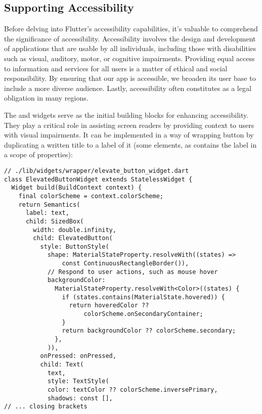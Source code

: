 
\subsection{Supporting Accessibility}

Before delving into Flutter's accessibility capabilities, it's valuable to comprehend the significance of accessibility. 
Accessibility involves the design and development of applications that are usable by all individuals, including those 
with disabilities such as visual, auditory, motor, or cognitive impairments. Providing equal access to information 
and services for all users is a matter of ethical and social responsibility. By ensuring that our app is accessible, 
we broaden its user base to include a more diverse audience. Lastly, accessibility often constitutes as a legal 
obligation in many regions.

The  and  widgets serve as the initial building blocks for enhancing accessibility. They play a 
critical role in assisting screen readers by providing context to users with visual impairments. It can be implemented 
in a way of wrapping button by duplicating a written title to a label of it (some elements, as  
contains the label in a scope of properties):

\begin{lstlisting}
// ./lib/widgets/wrapper/elevate_button_widget.dart
class ElevatedButtonWidget extends StatelessWidget {
  Widget build(BuildContext context) {
    final colorScheme = context.colorScheme;
    return Semantics(
      label: text,
      child: SizedBox(
        width: double.infinity,
        child: ElevatedButton(
          style: ButtonStyle(
            shape: MaterialStateProperty.resolveWith((states) => 
                const ContinuousRectangleBorder()),
            // Respond to user actions, such as mouse hover
            backgroundColor: 
              MaterialStateProperty.resolveWith<Color>((states) {
                if (states.contains(MaterialState.hovered)) {
                  return hoveredColor ?? 
                      colorScheme.onSecondaryContainer;
                }
                return backgroundColor ?? colorScheme.secondary;
              },
            )),
          onPressed: onPressed,
          child: Text(
            text,
            style: TextStyle(
            color: textColor ?? colorScheme.inversePrimary,
            shadows: const [],
// ... closing brackets
\end{lstlisting}

